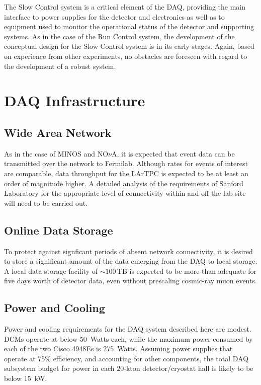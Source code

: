 The Slow Control system is a critical element of the DAQ, providing the 
main interface to power supplies for the detector and electronics as well  
as to equipment used to monitor the operational status of the detector and 
supporting systems.  As in the case of the Run Control system, the 
development of the conceptual design for the Slow Control system is in 
its early stages.  Again, based on experience from other experiments, 
no obstacles are foreseen with regard to the development of a robust 
system.

\section{DAQ Infrastructure }
\label{sec:v5-trig-infrastructure}


\subsection{Wide Area Network}

As in the case of MINOS and NO$\nu$A, it is expected that event data can be 
transmitted over the network to Fermilab.  Although rates for events of 
interest are comparable, data throughput for the \LBNE LArTPC is 
expected to be at least an order of magnitude higher.  A detailed 
analysis of the requirements of Sanford Laboratory for the appropriate level of 
connectivity within and off the lab site will need to be carried out.

\subsection{Online Data Storage}

To protect against signficant periods of absent network connectivity, it 
is desired to store a significant amount of the data emerging from the 
DAQ to local storage.  A local data storage facility of $\sim 100\,$TB is 
expected to be more than adequate for five days worth of detector data, 
even without prescaling cosmic-ray muon events.

\subsection{Power and Cooling}

Power and cooling requirements for the DAQ system described here are 
modest.  DCMs operate at below 50~Watts each, while the maximum power 
consumed by each of the two Cisco 4948Es is 275~Watts.  Assuming 
power supplies that operate at 75\% efficiency, and accounting for 
other components, the total DAQ subsystem budget for power 
in each 20-kton detector/cryostat hall is likely to be below 15~kW.


